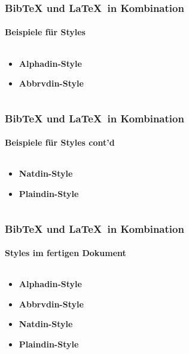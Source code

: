 \begin{frame}
\frametitle{BibTeX und \LaTeX ~in Kombination}
\framesubtitle{Beispiele für Styles}
\begin{columns}
\begin{column}{.3\textwidth}
\begin{itemize}
\item \textbf{Alphadin-Style}
\vspace*{20mm}
\item \textbf{Abbrvdin-Style}
\end{itemize}
\end{column}
\begin{column}{.7\textwidth}
\end{column}
\end{columns}
\end{frame}

\begin{frame}
\frametitle{BibTeX und \LaTeX ~in Kombination}
\framesubtitle{Beispiele für Styles cont'd}
\begin{columns}
\begin{column}{.3\textwidth}
\begin{itemize}
\item \textbf{Natdin-Style}
\vspace*{20mm}
\item \textbf{Plaindin-Style}
\end{itemize}
\end{column}
\begin{column}{.7\textwidth}
\end{column}
\end{columns}
\end{frame}

\begin{frame}
\frametitle{BibTeX und \LaTeX ~in Kombination}
\framesubtitle{Styles im fertigen Dokument}
\begin{columns}
\begin{column}{.3\textwidth}
\begin{itemize}
\item \textbf{Alphadin-Style}
\vspace*{10mm}
\item \textbf{Abbrvdin-Style}
\vspace*{10mm}
\item \textbf{Natdin-Style}
\vspace*{10mm}
\item \textbf{Plaindin-Style}
\end{itemize}
\end{column}
\begin{column}{.7\textwidth}
\vspace*{5mm}
\end{column}
\end{columns}
\end{frame}